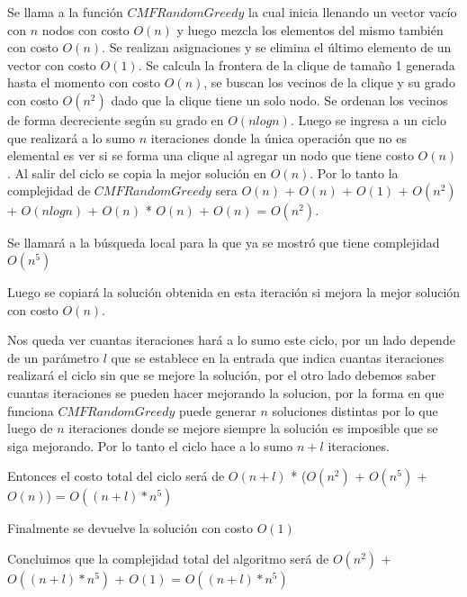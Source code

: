  Se llama a la función $CMFRandomGreedy$ la cual inicia llenando un vector vacío con $n$ nodos con costo $O(n)$ y luego mezcla los elementos del mismo también con costo $O(n)$. Se realizan asignaciones y se elimina el último elemento de un vector con costo $O(1)$. Se calcula la frontera de la clique de tamaño 1 generada hasta el momento con costo $O(n)$, se buscan los vecinos de la clique y su grado con costo $O(n^2)$ dado que la clique tiene un solo nodo. Se ordenan los vecinos de forma decreciente según su grado en $O(n log n)$. Luego se ingresa a un ciclo que realizará a lo sumo $n$ iteraciones donde la única operación que no es elemental es ver si se forma una clique al agregar un nodo que tiene costo $O(n)$. Al salir del ciclo se copia la mejor solución en $O(n)$. Por lo tanto la complejidad de $CMFRandomGreedy$ sera $O(n)$ + $O(n)$ + $O(1)$ + $O(n^2)$ + $O(n log n)$ + $O(n)$ * $O(n)$ + $O(n)$ = $O(n^2)$.

 Se llamará a la búsqueda local para la que ya se mostró que tiene complejidad $O(n^5)$

 Luego se copiará la solución obtenida en esta iteración si mejora la mejor solución con costo $O(n)$.

 Nos queda ver cuantas iteraciones hará a lo sumo este ciclo, por un lado depende de un parámetro $l$ que se establece en la entrada que indica cuantas iteraciones realizará el ciclo sin que se mejore la solución, por el otro lado debemos saber cuantas iteraciones se pueden hacer mejorando la solucion, por la forma en que funciona $CMFRandomGreedy$ puede generar $n$ soluciones distintas por lo que luego de $n$ iteraciones donde se mejore siempre la solución es imposible que se siga mejorando. Por lo tanto el ciclo hace a lo sumo $n + l$ iteraciones.

 Entonces el costo total del ciclo será de $O(n + l)$ * ($O(n^2)$ + $O(n^5)$ + $O(n)$) = $O((n+l) * n^5)$

 Finalmente se devuelve la solución con costo $O(1)$

 Concluimos que la complejidad total del algoritmo será de $O(n^2)$ + $O((n+l) * n^5)$ + $O(1)$ = $O((n+l) * n^5)$


